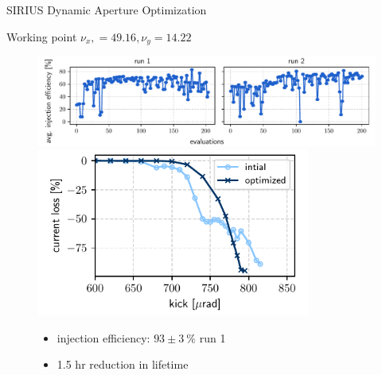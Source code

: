 \documentclass[aspectratio=169]{beamer}
\begin{document}
\begin{frame}{SIRIUS Dynamic Aperture Optimization}
    \begin{minipage}{0.55\textwidth}
        Working point $\nu_x, = 49.16, \nu_y = 14.22$
        \begin{figure}
            \centering
            \includegraphics[width=\textwidth]{wp3_history.pdf}
            \includegraphics[width = 0.8\textwidth]{wp3_kick_resilience.pdf}
            \begin{itemize}
                \item injection efficiency: $93\pm3~\%$ run 1
                \item 1.5 hr reduction in lifetime
            \end{itemize}
        \end{figure}
    \end{minipage}
    \hfill
    \begin{minipage}{0.44\textwidth}
        \begin{figure}
            \centering

\end{figure}
\end{minipage}
\end{frame}
\end{document}
